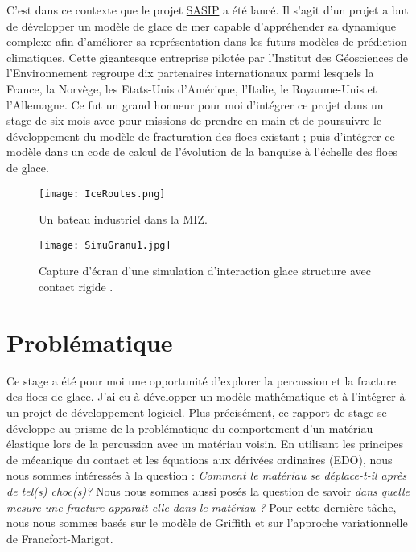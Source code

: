 C'est dans ce contexte que le projet \href{https://sasip-climate.github.io/}{SASIP} a été lancé. Il s'agit d'un projet a but de développer un modèle de glace de mer capable d'appréhender sa dynamique complexe afin d'améliorer sa représentation dans les futurs modèles de prédiction climatiques. Cette gigantesque entreprise pilotée par l'Institut des Géosciences de l'Environnement regroupe dix partenaires internationaux parmi lesquels la France, la Norvège, les Etats-Unis d'Amérique, l'Italie, le Royaume-Unis et l'Allemagne. Ce fut un grand honneur pour moi d'intégrer ce projet dans un stage de six mois avec pour missions de prendre en main et de poursuivre le développement du modèle de fracturation des floes existant ; puis d'intégrer ce modèle dans un code de calcul de l’évolution de la banquise à l’échelle des floes de glace.


\begin{figure}[!h]
    \centering
    \texttt{[image: IceRoutes.png]}
    \caption{Un bateau industriel dans la MIZ.}
    \label{fig:miz}
\end{figure}

\begin{figure}[!h]
    \centering
    \texttt{[image: SimuGranu1.jpg]}
    \caption{Capture d’écran d’une simulation d’interaction glace structure avec contact rigide \parencite[p.23]{balasoiu2020halthesis}.}
    \label{fig:simugranu1}
\end{figure}







\section{Problématique}


Ce stage a été pour moi une opportunité d'explorer la percussion et la fracture des floes de glace. J'ai eu à développer un modèle mathématique et à l'intégrer à un projet de développement logiciel. Plus précisément, ce rapport de stage se développe au prisme de la problématique du comportement d'un matériau élastique lors de la percussion avec un matériau voisin. En utilisant les principes de mécanique du contact et les équations aux dérivées ordinaires (EDO), nous nous sommes intéressés à la question : \emph{Comment le matériau se déplace-t-il après de tel(s) choc(s)?} Nous nous sommes aussi posés la question de savoir \emph{dans quelle mesure une fracture apparait-elle dans le matériau ?} Pour cette dernière tâche, nous nous sommes basés sur le modèle de Griffith et sur l'approche variationnelle de Francfort-Marigot.






